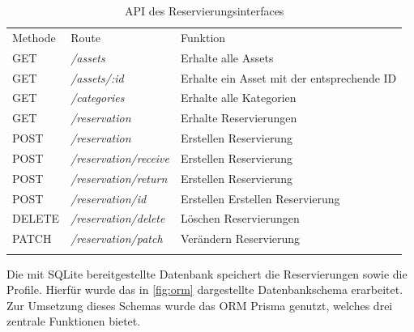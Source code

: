 \begin{table}[h]
  \centering
  \caption{API des Reservierungsinterfaces}
  \begin{tabular}{lll}
    \arrayrulecolor{maincolor}\hline
    \sffamily\color{maincolor}Methode & \sffamily\color{maincolor}Route &
    \sffamily\color{maincolor}Funktion                                                              \\
    \arrayrulecolor{maincolor}\hline
    GET                               & \textit{/assets}                & Erhalte alle Assets       \\
    GET                               & \textit{/assets/:id}            & Erhalte ein Asset mit der
    entsprechende ID                                                                                \\
    GET                               & \textit{/categories}            & Erhalte alle Kategorien   \\
    GET                               & \textit{/reservation}           & Erhalte Reservierungen    \\
    POST                              & \textit{/reservation}           & Erstellen Reservierung    \\
    POST                              & \textit{/reservation/receive}   & Erstellen Reservierung    \\
    POST                              & \textit{/reservation/return}    & Erstellen Reservierung    \\
    POST                              & \textit{/reservation/id}        & Erstellen Erstellen
    Reservierung                                                                                    \\
    DELETE                            & \textit{/reservation/delete}    & Löschen Reservierungen    \\
    PATCH                             & \textit{/reservation/patch}     & Verändern Reservierung    \\
    \arrayrulecolor{maincolor}\hline
  \end{tabular}
  \label{table:impl-backend-routes}
\end{table}

Die mit SQLite bereitgestellte Datenbank speichert die Reservierungen sowie die
Profile. Hierfür wurde das in \ref{fig:orm} dargestellte Datenbankschema
erarbeitet. Zur Umsetzung dieses Schemas wurde das ORM Prisma genutzt, welches
drei zentrale Funktionen bietet.

